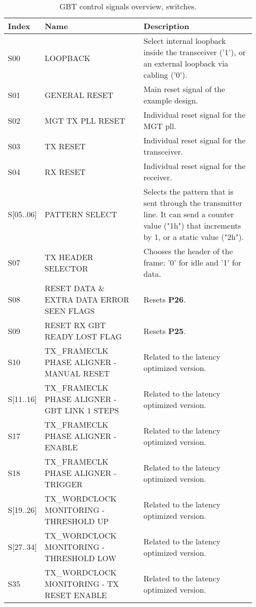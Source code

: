 \documentclass[main.tex]{subfiles}
\begin{document}
\begin{table}[H]
\small
\begin{center}
  \begin{tabular}{| l | p{5cm} | p{8cm} |}
  \hline
    Index & Name & Description   \\
    \hline
  S00     & LOOPBACK                        & Select internal loopback inside the transceiver ('1'), or an external loopback via cabling ('0'). \\ \hline
  S01     & GENERAL RESET                     & Main reset signal of the example design. \\ \hline
  S02     & MGT TX PLL RESET                    & Individual reset signal for the MGT pll. \\ \hline
  S03     & TX RESET                        & Individual reset signal for the transceiver. \\ \hline
  S04     & RX RESET                        & Individual reset signal for the receiver. \\ \hline
  S[05..06]   & PATTERN SELECT                    & Selects the pattern that is sent through the transmitter line.
  It can send a counter value ("1h") that increments by 1, or a static value ("2h"). \\ \hline
  S07     & TX HEADER SELECTOR                  & Chooses the header of the frame: '0' for idle and '1' for data. \\ \hline
  S08     & RESET DATA \& EXTRA DATA ERROR SEEN FLAGS       & Resets \textbf{P26}.\\ \hline
  S09     & RESET RX GBT READY LOST FLAG              & Resets \textbf{P25}.\\ \hline
  S10     & TX\_FRAMECLK PHASE ALIGNER - MANUAL RESET         & Related to the latency optimized version.\\ \hline
  S[11..16] & TX\_FRAMECLK PHASE ALIGNER - GBT LINK 1 STEPS       & Related to the latency optimized version.\\ \hline
  S17     & TX\_FRAMECLK PHASE ALIGNER - ENABLE           & Related to the latency optimized version.\\ \hline
  S18     & TX\_FRAMECLK PHASE ALIGNER - TRIGGER          & Related to the latency optimized version.\\ \hline
  S[19..26]   & TX\_WORDCLOCK MONITORING - THRESHOLD UP         & Related to the latency optimized version.\\ \hline
  S[27..34]   & TX\_WORDCLOCK MONITORING - THRESHOLD LOW        & Related to the latency optimized version.\\ \hline
  S35     & TX\_WORDCLOCK MONITORING - TX RESET ENABLE      & Related to the latency optimized version.\\ \hline
  \end{tabular}
    \caption{GBT control signals overview, switches.}
  \label{tab:switch}  
\end{center}
\end{table}
\end{document}
